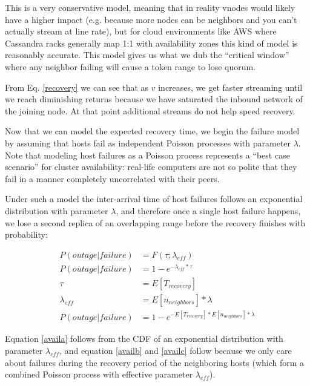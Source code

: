 \documentclass{article}
\begin{document}
This is a very conservative model, meaning that in reality vnodes would likely
have a higher impact (e.g. because more nodes can be neighbors and you can't
actually stream at line rate), but for cloud environments like AWS where
Cassandra racks generally map 1:1 with availability zones this kind of
model is reasonably accurate. This model gives us what we dub the
``critical window'' where any neighbor failing will cause a token range to lose
quorum.

From Eq. \ref{recovery} we can see that as $v$ increases, we get faster
streaming until we reach diminishing returns because we have saturated the
inbound network of the joining node. At that point additional streams do not
help speed recovery.

Now that we can model the expected recovery time, we begin the failure model by
assuming that hosts fail as independent Poisson processes with parameter
$\lambda$. Note that modeling host failures as a Poisson process represents a
``best case scenario'' for cluster availability: real-life computers are not so
polite that they fail in a manner completely uncorrelated with their peers.

Under such a model the inter-arrival time of host failures follows an
exponential distribution with parameter $\lambda$, and therefore once a single
host failure happens, we lose a second replica of an overlapping range before
the recovery finishes with probability:

\begin{subequations} \label{avail}
\begin{align}
        P(outage|failure) & = F(\tau; \lambda_{eff}) \\ \label{availa}
        P(outage|failure) & = 1 - e^{-\lambda_{eff} * \tau} \\ \label{availb}
        \tau & = E[T_{recovery}] \\ \label{availc}
        \lambda_{eff} & = E[n_{neighbors}] * \lambda \\ \label{availd}
        P(outage|failure) & = 1 - e^{- E[T_{recovery}] * E[n_{neighbors}] * \lambda}
\end{align}
\end{subequations}

Equation \ref{availa} follows from the CDF of an exponential distribution with
parameter $\lambda_{eff}$, and equation \ref{availb} and \ref{availc} follow
because we only care about failures during the recovery period of the
neighboring hosts (which form a combined Poisson process with effective
parameter $\lambda_{eff}$).
\end{document}
